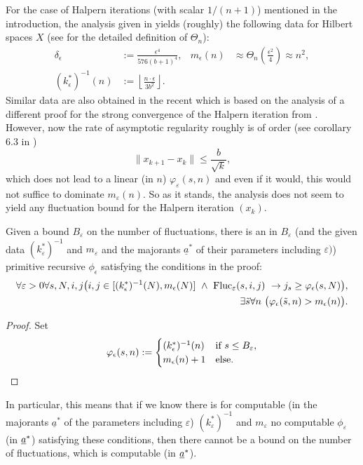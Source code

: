For the case of Halpern iterations (with scalar $1/(n+1)$) mentioned in 
the introduction, the analysis given in \cite{Kohlenbach/Leustean6}   
yields (roughly) the following data for Hilbert spaces $X$ 
(see \cite{Kohlenbach/Leustean6} for the 
detailed definition of $\Theta_n$):
\begin{align*}
\delta_\epsilon &:= \frac{\epsilon^4}{576(b+1)^4},& m_\epsilon(n)&\approx \Theta_n(\frac{\epsilon^2}{4})\approx n^2,\\
(k^*_\epsilon)^{-1}(n)&:=\left\lfloor\frac{n\cdot\epsilon}{3b^2}
\right\rfloor.& 
\end{align*}
Similar data are also obtained  
in the recent \cite{Koernlein} which is based on the analysis of a different 
proof for the strong convergence of the Halpern iteration from 
\cite{Xu}.\\
However, now the rate of asymptotic regularity roughly is of order (see 
corollary 6.3 in \cite{Kohlenbach/Leustean6}) 
\[ \| x_{k+1}-x_k\| \le \frac{b}{\sqrt{k}}, \] 
which does not lead to a linear (in $n$) $\varphi_{\varepsilon}(s,n)$ and 
even if it would, this would not suffice to dominate $m_{\varepsilon}(n).$ 
So as it stands, the analysis does not seem to yield any fluctuation 
bound for the Halpern iteration $(x_k).$

\begin{prop}
Given a bound $B_{\varepsilon}$ on the number of fluctuations, there is an in $B_{\varepsilon}$ (and the given data 
$(k^*_{\varepsilon})^{-1}$ and $m_{\varepsilon}$ and the majorants $\underline{a}^*$ of their parameters including $\varepsilon)$) 
primitive recursive $\phi_\epsilon$
satisfying the conditions in the proof:
\begin{align}
\forall \varepsilon >0 \forall s,N,i,j \big( i,j\in[(k^*_\epsilon)^{-1}(N),
m_\epsilon(N)]\ \wedge\ \Fluc_{\varepsilon}(s,i,j)\ 
\rightarrow j_s\geq \phi_\epsilon(s,N) \big),\label{e:FU1}\\
\exists \tilde s\forall n\ \big(\phi_\epsilon(\tilde s,n)>m_\epsilon(n)\big).\label{e:FU2}
\end{align}
\end{prop}
\begin{proof}
Set
\[
\varphi_\epsilon(s,n):=\begin{cases}
(k^*_\epsilon)^{-1}(n)&\text{if}\ s\leq B_{\varepsilon},\\
m_\epsilon(n)+1&\text{else}.
\end{cases}
\]
\end{proof}
\vspace*{-3mm}
\begin{rmk}
In particular, this means that if we know there is for computable 
(in the majorants $\underline{a}^*$ of the parameters including $\varepsilon$) 
$(k^*_{\varepsilon})^{-1}$ and $m_{\varepsilon}$ 
no computable $\phi_{\varepsilon}$ (in $\underline a^*$) satisfying these conditions,
then there cannot be a bound on the number of fluctuations, which is computable (in $\underline a^*$).
\end{rmk}


